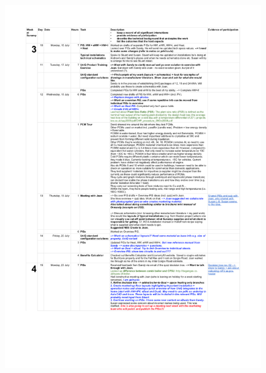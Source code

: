 \begin{figure}
	\centering
	\includegraphics[height=\textheight]{Appendices/Log_02.png}
\end{figure}


